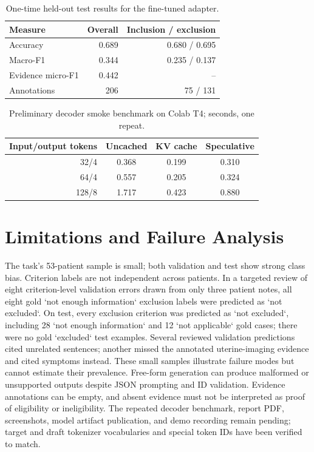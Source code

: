 \documentclass[conference]{IEEEtran}
\begin{document}
\begin{table}[ht]
\caption{One-time held-out test results for the fine-tuned adapter.}
\label{tab:test}
\centering
\begin{tabular}{lrr}\toprule Measure & Overall & Inclusion / exclusion\\\midrule
Accuracy & 0.689 & 0.680 / 0.695\\
Macro-F1 & 0.344 & 0.235 / 0.137\\
Evidence micro-F1 & 0.442 & --\\
Annotations & 206 & 75 / 131\\\bottomrule\end{tabular}
\end{table}

\begin{table}[ht]
\caption{Preliminary decoder smoke benchmark on Colab T4; seconds, one repeat.}
\centering
\begin{tabular}{rccc}\toprule Input/output tokens & Uncached & KV cache & Speculative\\\midrule 32/4 & 0.368 & 0.199 & 0.310\\64/4 & 0.557 & 0.205 & 0.324\\128/8 & 1.717 & 0.423 & 0.880\\\bottomrule\end{tabular}
\end{table}

\section{Limitations and Failure Analysis}
The task's 53-patient sample is small; both validation and test show strong class bias. Criterion labels are not independent across patients. In a targeted review of eight criterion-level validation errors drawn from only three patient notes, all eight gold `not enough information` exclusion labels were predicted as `not excluded`. On test, every exclusion criterion was predicted as `not excluded`, including 28 `not enough information` and 12 `not applicable` gold cases; there were no gold `excluded` test examples. Several reviewed validation predictions cited unrelated sentences; another missed the annotated uterine-imaging evidence and cited symptoms instead. These small samples illustrate failure modes but cannot estimate their prevalence. Free-form generation can produce malformed or unsupported outputs despite JSON prompting and ID validation. Evidence annotations can be empty, and absent evidence must not be interpreted as proof of eligibility or ineligibility. The repeated decoder benchmark, report PDF, screenshots, model artifact publication, and demo recording remain pending; target and draft tokenizer vocabularies and special token IDs have been verified to match.
\end{document}
